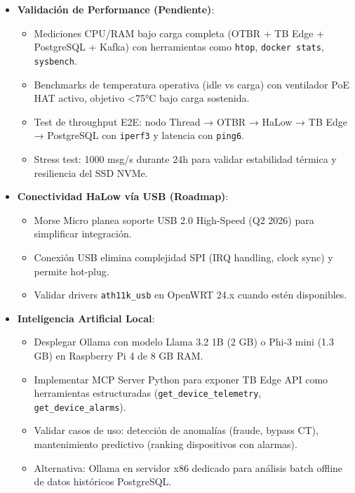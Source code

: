 \begin{itemize}
    \item \textbf{Validación de Performance (Pendiente)}:
    \begin{itemize}
        \item Mediciones CPU/RAM bajo carga completa (OTBR + TB Edge + PostgreSQL + Kafka) con herramientas como \texttt{htop}, \texttt{docker stats}, \texttt{sysbench}.
        \item Benchmarks de temperatura operativa (idle vs carga) con ventilador PoE HAT activo, objetivo <75°C bajo carga sostenida.
        \item Test de throughput E2E: nodo Thread → OTBR → HaLow → TB Edge → PostgreSQL con \texttt{iperf3} y latencia con \texttt{ping6}.
        \item Stress test: 1000 msg/s durante 24h para validar estabilidad térmica y resiliencia del SSD NVMe.
    \end{itemize}
    
    \item \textbf{Conectividad HaLow vía USB (Roadmap)}:
    \begin{itemize}
        \item Morse Micro planea soporte USB 2.0 High-Speed (Q2 2026) para simplificar integración.
        \item Conexión USB elimina complejidad SPI (IRQ handling, clock sync) y permite hot-plug.
        \item Validar drivers \texttt{ath11k\_usb} en OpenWRT 24.x cuando estén disponibles.
    \end{itemize}
    
    \item \textbf{Inteligencia Artificial Local}:
    \begin{itemize}
        \item Desplegar Ollama con modelo Llama 3.2 1B (2 GB) o Phi-3 mini (1.3 GB) en Raspberry Pi 4 de 8 GB RAM.
        \item Implementar MCP Server Python para exponer TB Edge API como herramientas estructuradas (\texttt{get\_device\_telemetry}, \texttt{get\_device\_alarms}).
        \item Validar casos de uso: detección de anomalías (fraude, bypass CT), mantenimiento predictivo (ranking dispositivos con alarmas).
        \item Alternativa: Ollama en servidor x86 dedicado para análisis batch offline de datos históricos PostgreSQL.
    \end{itemize}
    

\end{itemize}
